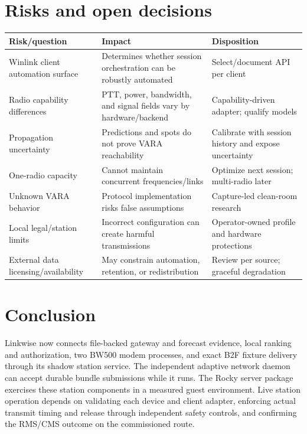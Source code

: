 \documentclass[11pt,a4paper]{article}
\begin{document}
\section{Risks and open decisions}

\clearpage
\begin{landscape}
\thispagestyle{plain}
\label{tab:risks}
\begin{tabularx}{\linewidth}{@{}p{2.0in}X p{2.0in}@{}}
\toprule
\textbf{Risk/question} & \textbf{Impact} & \textbf{Disposition}\\
\midrule
Winlink client automation surface & Determines whether session orchestration can be robustly automated & Select/document API per client \\
Radio capability differences & PTT, power, bandwidth, and signal fields vary by hardware/backend & Capability-driven adapter; qualify models \\
Propagation uncertainty & Predictions and spots do not prove VARA reachability & Calibrate with session history and expose uncertainty \\
One-radio capacity & Cannot maintain concurrent frequencies/links & Optimize next session; multi-radio later \\
Unknown VARA behavior & Protocol implementation risks false assumptions & Capture-led clean-room research \\
Local legal/station limits & Incorrect configuration can create harmful transmissions & Operator-owned profile and hardware protections \\
External data licensing/availability & May constrain automation, retention, or redistribution & Review per source; graceful degradation \\
\bottomrule
\end{tabularx}
\end{landscape}
\clearpage

\section{Conclusion}

Linkwise now connects file-backed gateway and forecast evidence, local
ranking and authorization, two BW500 modem processes, and exact B2F fixture
delivery through its shadow station service. The independent adaptive
network daemon can accept durable bundle submissions while it runs.
The Rocky server package exercises these station components in a measured
guest environment. Live station operation depends on validating each
device and client adapter, enforcing actual transmit timing and release
through independent safety controls, and confirming the RMS/CMS outcome on
the commissioned route.
\end{document}
